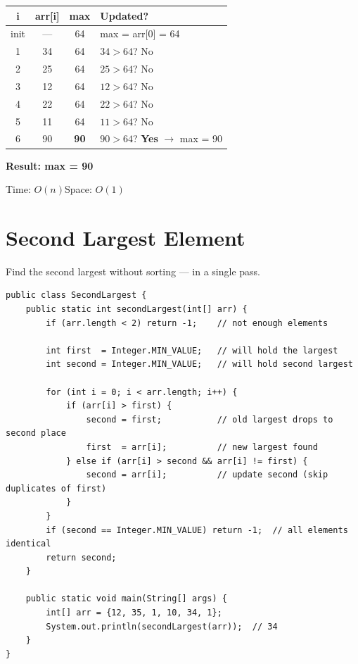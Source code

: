 \documentclass[12pt,a4paper,oneside]{book}
\begin{document}
\begin{dryrun}
\begin{center}
\begin{tabular}{cccl}
\toprule
\textbf{i} & \textbf{arr[i]} & \textbf{max} & \textbf{Updated?}\\
\midrule
init& ---  & 64 & max = arr[0] = 64\\
1   & 34   & 64 & $34 > 64$? No\\
2   & 25   & 64 & $25 > 64$? No\\
3   & 12   & 64 & $12 > 64$? No\\
4   & 22   & 64 & $22 > 64$? No\\
5   & 11   & 64 & $11 > 64$? No\\
6   & 90   & \textbf{90} & $90 > 64$? \textbf{Yes} $\to$ max = 90\\
\bottomrule
\end{tabular}
\end{center}
\textbf{Result: max = 90}
\end{dryrun}

\begin{complexity}
Time: $O(n)$\quad Space: $O(1)$
\end{complexity}

\section{Second Largest Element}

Find the second largest without sorting --- in a single pass.

\begin{lstlisting}[caption={Second Largest --- Single Pass $O(n)$}]
public class SecondLargest {
    public static int secondLargest(int[] arr) {
        if (arr.length < 2) return -1;    // not enough elements

        int first  = Integer.MIN_VALUE;   // will hold the largest
        int second = Integer.MIN_VALUE;   // will hold second largest

        for (int i = 0; i < arr.length; i++) {
            if (arr[i] > first) {
                second = first;           // old largest drops to second place
                first  = arr[i];          // new largest found
            } else if (arr[i] > second && arr[i] != first) {
                second = arr[i];          // update second (skip duplicates of first)
            }
        }
        if (second == Integer.MIN_VALUE) return -1;  // all elements identical
        return second;
    }

    public static void main(String[] args) {
        int[] arr = {12, 35, 1, 10, 34, 1};
        System.out.println(secondLargest(arr));  // 34
    }
}
\end{lstlisting}
\end{document}
